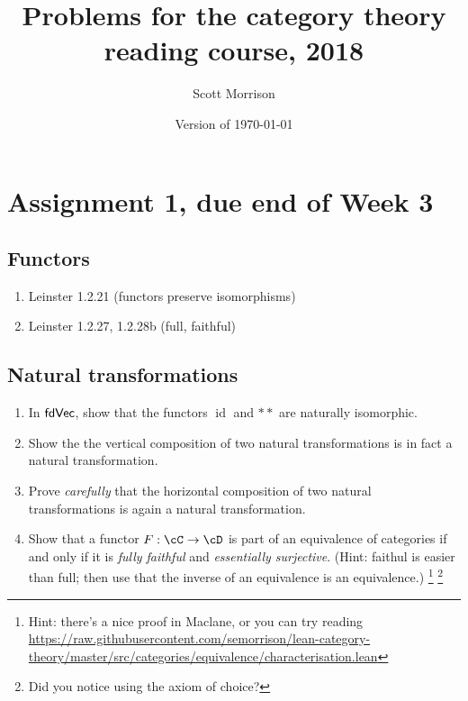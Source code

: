 \documentclass[12pt]{amsart}
\begin{document}
\title{Problems for the category theory reading course, 2018}
\author{Scott Morrison}
  \address[Scott Morrison]{
  	Mathematical Sciences Institute,
  	Australian National University
  }
\date{Version of \today}

\maketitle 

\section{Assignment 1, due end of Week 3}

\subsection{Functors}
\begin{enumerate}
\item Leinster 1.2.21 (functors preserve isomorphisms)
\item Leinster 1.2.27, 1.2.28b (full, faithful)
\end{enumerate}

\subsection{Natural transformations}
\begin{enumerate}
\item In $\sf{fdVec}$, show that the functors $\operatorname{id}$ and $**$ are naturally isomorphic. 
\item Show the the vertical composition of two natural transformations is in fact a natural transformation. 
\item Prove \emph{carefully} that the horizontal composition of two natural transformations is again a natural transformation.
\item Show that a functor $F : \cC \to \cD$ is part of an equivalence of categories if and only if it is \emph{fully faithful} and \emph{essentially surjective}. (Hint: faithul is easier than full; then use that the inverse of an equivalence is an equivalence.) \footnote{Hint: there's a nice proof in Maclane, or you can try reading \url{https://raw.githubusercontent.com/semorrison/lean-category-theory/master/src/categories/equivalence/characterisation.lean}} \footnote{Did you notice using the axiom of choice?}
\end{enumerate}
\end{document}
